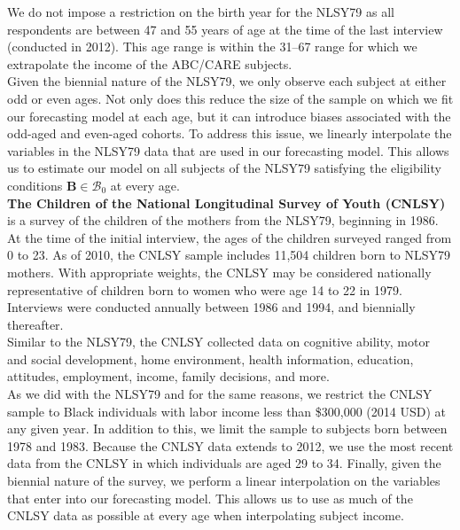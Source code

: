 \noindent We do not impose a restriction on the birth year for the NLSY79 as all respondents are between 47 and 55 years of age at the time of the last interview (conducted in 2012). This age range is within the 31--67 range for which we extrapolate the income of the ABC/CARE subjects.\\

\noindent Given the biennial nature of the NLSY79, we only observe each subject at either odd or even ages. Not only does this reduce the size of the sample on which we fit our forecasting model at each age, but it can introduce biases associated with the odd-aged and even-aged cohorts. To address this issue, we linearly interpolate the variables in the NLSY79 data that are used in our forecasting model. This allows us to estimate our model on all subjects of the NLSY79 satisfying the eligibility conditions $\bm{B}\in\mathcal{B}_0$ at every age.\\

\noindent\textbf{The Children of the National Longitudinal Survey of Youth (CNLSY)} is a survey of the children of the mothers from the NLSY79, beginning in 1986. At the time of the initial interview, the ages of the children surveyed ranged from 0 to 23. As of 2010, the CNLSY sample includes 11,504 children born to NLSY79 mothers. With appropriate weights, the CNLSY may be considered nationally representative of children born to women who were age 14 to 22 in 1979. Interviews were conducted annually between 1986 and 1994, and biennially thereafter.\\

\noindent Similar to the NLSY79, the CNLSY collected data on cognitive ability, motor and social development, home environment, health information, education, attitudes, employment, income, family decisions, and more.\\

\noindent As we did with the NLSY79 and for the same reasons, we restrict the CNLSY sample to Black individuals with labor income less than \$300,000 (2014 USD) at any given year. In addition to this, we limit the sample to subjects born between 1978 and 1983. Because the CNLSY data extends to 2012, we use the most recent data from the CNLSY in which individuals are aged 29 to 34. Finally, given the biennial nature of the survey, we perform a linear interpolation on the variables that enter into our forecasting model. This allows us to use as much of the CNLSY data as possible at every age when interpolating subject income.\\

